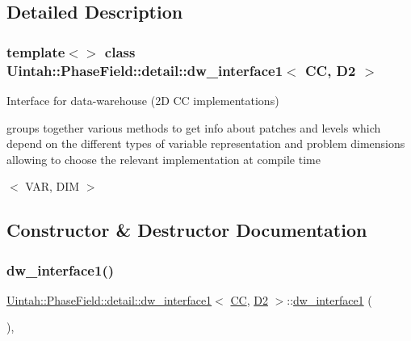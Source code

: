 \subsection{Detailed Description}
\subsubsection*{template$<$$>$\newline
class Uintah\+::\+Phase\+Field\+::detail\+::dw\+\_\+interface1$<$ C\+C, D2 $>$}

Interface for data-\/warehouse (2D CC implementations) 

groups together various methods to get info about patches and levels which depend on the different types of variable representation and problem dimensions allowing to choose the relevant implementation at compile time

$<$ V\+AR, D\+IM $>$ 

\subsection{Constructor \& Destructor Documentation}
\mbox{\label{classUintah_1_1PhaseField_1_1detail_1_1dw__interface1_3_01CC_00_01D2_01_4_a952c66c5a34fe4f1181e5759bc3497b0}} 
\subsubsection{\texorpdfstring{dw\+\_\+interface1()}{dw\_interface1()}\hspace{0.1cm}{\footnotesize\ttfamily [1/2]}}
{\footnotesize\ttfamily \hyperlink{classUintah_1_1PhaseField_1_1detail_1_1dw__interface1}{Uintah\+::\+Phase\+Field\+::detail\+::dw\+\_\+interface1}$<$ \hyperlink{namespaceUintah_1_1PhaseField_a33d355affda78a83f45755ba8388cedda22303704507d024d1d6508ed9859a85a}{CC}, \hyperlink{namespaceUintah_1_1PhaseField_a12bfc68444894dffdf0cb8d9cf0cc76aa1a451dae278b0103a94105c8776e9a67}{D2} $>$\+::\hyperlink{classUintah_1_1PhaseField_1_1detail_1_1dw__interface1}{dw\+\_\+interface1} (\begin{DoxyParamCaption}{ }\end{DoxyParamCaption})\hspace{0.3cm}{\ttfamily [protected]}, {\ttfamily [delete]}}



